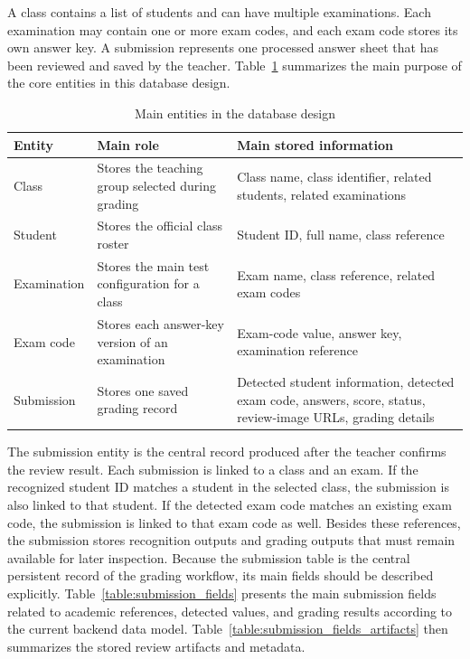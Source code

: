 \documentclass[../Main.tex]{subfiles}
\begin{document}
A class contains a list of students and can have multiple examinations. Each
examination may contain one or more exam codes, and each exam code stores its
own answer key. A submission represents one processed answer sheet that has
been reviewed and saved by the teacher. Table~\ref{table:database_entities}
summarizes the main purpose of the core entities in this database design.

\begin{table}[H]
\centering
\caption{Main entities in the database design}
\label{table:database_entities}
\footnotesize
\setlength{\tabcolsep}{3pt}
\renewcommand{\arraystretch}{1.15}
\begin{tabular}{|p{}|p{}|p{}|}
\hline
\textbf{Entity} & \textbf{Main role} & \textbf{Main stored information} \\ \hline
Class & Stores the teaching group selected during grading & Class name, class identifier, related students, related examinations \\ \hline
Student & Stores the official class roster & Student ID, full name, class reference \\ \hline
Examination & Stores the main test configuration for a class & Exam name, class reference, related exam codes \\ \hline
Exam code & Stores each answer-key version of an examination & Exam-code value, answer key, examination reference \\ \hline
Submission & Stores one saved grading record & Detected student information, detected exam code, answers, score, status, review-image URLs, grading details \\ \hline
\end{tabular}
\end{table}

The submission entity is the central record produced after the teacher confirms
the review result. Each submission is linked to a class and an exam. If the
recognized student ID matches a student in the selected class, the submission
is also linked to that student. If the detected exam code matches an existing
exam code, the submission is linked to that exam code as well. Besides these
references, the submission stores recognition outputs and grading outputs that
must remain available for later inspection. Because the submission table is the
central persistent record of the grading workflow, its main fields should be
described explicitly. Table~\ref{table:submission_fields} presents the main
submission fields related to academic references, detected values, and grading
results according to the current backend data model. Table~\ref{table:submission_fields_artifacts}
then summarizes the stored review artifacts and metadata.
\end{document}
